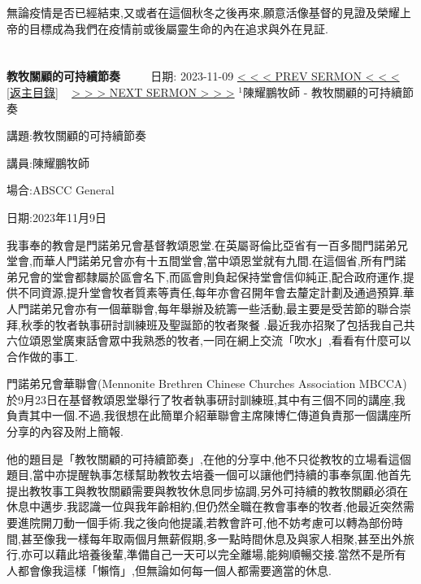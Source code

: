 \documentclass{book}
\begin{document}
無論疫情是否已經結束,又或者在這個秋冬之後再來,願意活像基督的見證及榮耀上帝的目標成為我們在疫情前或後屬靈生命的內在追求與外在見証.
\newpage



\section{}
\label{sec:7}
\textbf{教牧關顧的可持續節奏}
\newline
\newline
~~~~ 日期: 2023-11-09
\newline
\newline
\hyperref[sec:6]{\small{< < < PREV SERMON < < <}}
~
\hyperref[sec:index]{\small{[返主目錄]}}
~
\hyperref[sec:8]{\small{> > > NEXT SERMON > > >}}
\newline
\newline
$^{1}$陳耀鵬牧師 - 教牧關顧的可持續節奏

講題:教牧關顧的可持續節奏

講員:陳耀鵬牧師

場合:ABSCC General

日期:2023年11月9日

我事奉的教會是門諾弟兄會基督教頌恩堂.在英屬哥倫比亞省有一百多間門諾弟兄堂會,而華人門諾弟兄會亦有十五間堂會,當中頌恩堂就有九間.在這個省,所有門諾弟兄會的堂會都隸屬於區會名下,而區會則負起保持堂會信仰純正,配合政府運作,提供不同資源,提升堂會牧者質素等責任,每年亦會召開年會去釐定計劃及通過預算.華人門諾弟兄會亦有一個華聯會,每年舉辦及統籌一些活動,最主要是受苦節的聯合崇拜,秋季的牧者執事研討訓練班及聖誕節的牧者聚餐 .最近我亦招聚了包括我自己共六位頌恩堂廣東話會眾中我熟悉的牧者,一同在網上交流「吹水」,看看有什麼可以合作做的事工.

門諾弟兄會華聯會(Mennonite Brethren Chinese Churches Association MBCCA) 於9月23日在基督教頌恩堂舉行了牧者執事研討訓練班,其中有三個不同的講座,我負責其中一個.不過,我很想在此簡單介紹華聯會主席陳博仁傳道負責那一個講座所分享的內容及附上簡報.

他的題目是「教牧關顧的可持續節奏」,在他的分享中,他不只從教牧的立場看這個題目,當中亦提醒執事怎樣幫助教牧去培養一個可以讓他們持續的事奉氛圍.他首先提出教牧事工與教牧關顧需要與教牧休息同步協調,另外可持續的教牧關顧必須在休息中邁步.我認識一位與我年齡相約,但仍然全職在教會事奉的牧者,他最近突然需要進院開刀動一個手術.我之後向他提議,若教會許可,他不妨考慮可以轉為部份時間,甚至像我一樣每年取兩個月無薪假期,多一點時間休息及與家人相聚,甚至出外旅行,亦可以藉此培養後輩,準備自己一天可以完全離場,能夠順暢交接.當然不是所有人都會像我這樣「懶惰」,但無論如何每一個人都需要適當的休息.
\end{document}

